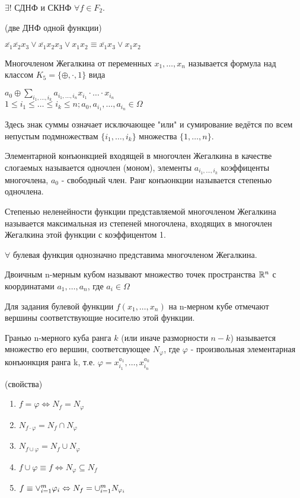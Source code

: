 \utv $\exists!$ СДНФ и СКНФ $\forall f \in F_2$.

\example (две ДНФ одной функции) \par $\overline{x_1}\overline{x_2}x_3 \vee \overline{x_1}x_2x_3 \vee x_1x_2 \equiv \overline{x_1}x_3 \vee x_1x_2$

\opr Многочленом Жегалкина от переменных $x_1, \dotsc, x_n$ называется формула над классом $K_5=\{\oplus, \cdot, 1\}$ вида
\begin{center}
	$a_0 \oplus \sum_{i_1, \dotsc,i_k} a_{i_1, \dotsc, i_n}x_{i_1}\cdot \dotsc \cdot x_{i_n}$\\$1 \leq i_1 \leq \dotsc \leq i_k \leq n; a_0, a_{i_1}, \dotsc, a_{i_n} \in \Omega$
\end{center}
Здесь знак суммы означает исключающее "или" и сумирование ведётся по всем непустым подмножествам $\{i_1, \dotsc, i_k\}$ множества $\{1, \dotsc, n\}$.

\opr Элементарной конъюнкцией входящей в многочлен Жегалкина в качестве слогаемых называется одночлен (моном), элементы $a_{i_1, \dotsc, i_k}$ коэффиценты многочлена, $a_0$ - свободный член. Ранг конъюнкции называется степенью одночлена. \par Степенью неленейности функции представляемой многочленом Жегалкина называется максимальная из степеней многочлена, входящих в многочлен Жегалкина этой функции с коэффицентом 1.

\thr $\forall$ булевая функция однозначно представима многочленом Жегалкина.

\opr Двоичным n-мерным кубом называют множество точек пространства $\mathbb{R}^n$ с координатами $a_1, \dotsc, a_n$, где $a_i \in \Omega$

Для задания булевой функции $f(x_1,\dotsc,x_n)$ на n-мерном кубе отмечают вершины соответствующие носителю этой функции.

\opr Гранью n-мерного куба ранга $k$ (или иначе разморности $n-k$) называется множество его вершин, соответсвующее $N_{\varphi}$, где $\varphi$ - произвольная элементарная конъюнкция ранга k, т.е. $\varphi = x_{i_1}^{a_1}, \dotsc, x_{i_n}^{a_k}$

\utv(свойства)
\begin{enumerate} 
	\item $f = \varphi \Leftrightarrow N_f = N_{\varphi}$
	\item $N_{f \cdot \varphi} = N_f \cap N_{\varphi}$
	\item $N_{f \cup \varphi} = N_f \cup N_{\varphi}$
	\item $f \cup \varphi \equiv f \Leftrightarrow N_{\varphi}\subseteq N_f$
	\item $f \equiv \Large\vee_{i=1}^m\varphi_i \Leftrightarrow N_f = \Large\cup_{i=1}^mN_{\varphi_i}$
\end{enumerate}

